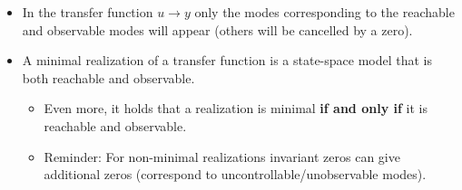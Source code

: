 \begin{itemize}
    \item In the transfer function $u \rightarrow y$ only the modes corresponding to the reachable and observable modes will appear (others will be cancelled by a zero).
    \item A minimal realization of a transfer function is a state-space model that is both reachable and observable.
    \begin{itemize}
        \item Even more, it holds that a realization is minimal \textbf{if and only if} it is reachable and observable.
        \item Reminder: For non-minimal realizations invariant zeros can give additional zeros (correspond to uncontrollable/unobservable modes).
    \end{itemize}
\end{itemize}

